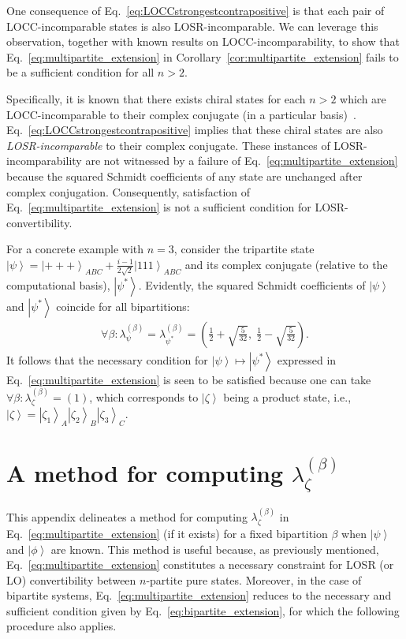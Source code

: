 \documentclass[prx,11pt,letterpaper,twocolumn,accepted=2023-11-27]{quantumarticle}
\newcommand{\ket}[1]{\left| #1 \right>}
\theoremstyle{plain}
\theoremstyle{definition}
\begin{document}
\begin{appendices}
One consequence of Eq.~\eqref{eq:LOCCstrongestcontrapositive} is that each pair of LOCC-incomparable states is also LOSR-incomparable. We can leverage this observation, together with known results on LOCC-incomparability, to show that Eq.~\eqref{eq:multipartite_extension} in Corollary~\ref{cor:multipartite_extension} fails to be a sufficient condition for all $n > 2$.

Specifically, it is known that there exists chiral states for each $n > 2$ which are LOCC-incomparable to their complex conjugate (in a particular basis)~\cite{bennett2000exact,Kraus2010Local}. Eq.~\eqref{eq:LOCCstrongestcontrapositive} implies that these chiral states are also {\em LOSR-incomparable} to their complex conjugate. These instances of LOSR-incomparability are not witnessed by a failure of Eq.~\eqref{eq:multipartite_extension}
 because the squared Schmidt coefficients of any state are unchanged after complex conjugation. Consequently, satisfaction of Eq.~\eqref{eq:multipartite_extension} is not a sufficient condition for LOSR-convertibility.


For a concrete example with $n=3$,
  consider the tripartite state $\ket{\psi} = \ket{+++}_{ABC} + \frac{i - 1}{2 \sqrt{2}} \ket{111}_{ABC}$ and its complex conjugate (relative to the computational basis), $\ket{\psi^{\ast}}$. Evidently, the squared Schmidt coefficients of $\ket{\psi}$ and $\ket{\psi^{\ast}}$ 
 coincide for all bipartitions:
\begin{align} \label{psipsistar}
    \forall \beta : \lambda^{(\beta)}_{\psi} = \lambda^{(\beta)}_{\psi^{\ast}} = \left(\tfrac12 + \sqrt{\tfrac{5}{32}},\;\tfrac12 - \sqrt{\tfrac{5}{32}}\right).
\end{align}
It follows that the necessary condition for $\ket{\psi} \mapsto \ket{\psi^{\ast}}$ expressed in Eq.~\eqref{eq:multipartite_extension} is seen to be satisfied because one can take $\forall \beta: \lambda_{\zeta}^{(\beta)} = (1)$, which corresponds to $\ket{\zeta}$ being a product state,
  i.e., $\ket{\zeta} = \ket{\zeta_1}_A\ket{\zeta_2}_B\ket{\zeta_3}_C$. 

\section{A method for computing $\lambda_{\zeta}^{(\beta)}$} \label{alg}

This appendix delineates a method for computing $\lambda_{\zeta}^{(\beta)}$ in Eq.~\eqref{eq:multipartite_extension} (if it exists) for a fixed bipartition $\beta$ when $\ket{\psi}$ and $\ket{\phi}$ are known. This method is useful because, as previously mentioned, Eq.~\eqref{eq:multipartite_extension} constitutes a necessary constraint for LOSR (or LO) convertibility between $n$-partite pure states.
Moreover, in the case of bipartite systems, Eq.~\eqref{eq:multipartite_extension} reduces to the necessary and sufficient condition given by Eq.~\eqref{eq:bipartite_extension}, for which the following procedure also applies.


\end{appendices}
\end{document}
